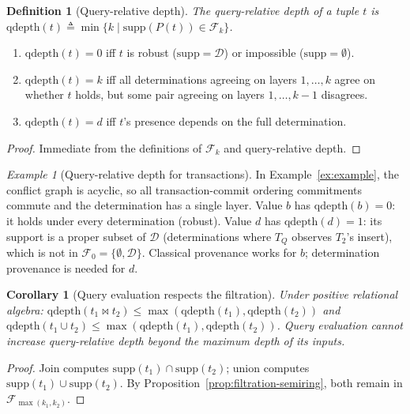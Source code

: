 \documentclass[acmsmall,review,anonymous]{acmart}
\newtheorem{definition}{Definition}
\newtheorem{corollary}{Corollary}
\theoremstyle{remark}
\newtheorem{example}{Example}
\numberwithin{definition}{section}
\numberwithin{theorem}{section}
\numberwithin{lemma}{section}
\numberwithin{corollary}{section}
\numberwithin{remark}{section}
\numberwithin{example}{section}
\numberwithin{observation}{section}
\numberwithin{assumption}{section}
\begin{document}
\begin{definition}[Query-relative depth]
  \label{def:query-depth}
  The \emph{query-relative depth} of a tuple $t$ is
  $\mathrm{qdepth}(t) \triangleq
  \min\{k \mid \mathrm{supp}(P(t)) \in \mathcal{F}_k\}$.
\end{definition}

\begin{proposition}[Characterization]
  \label{prop:qdepth-characterization}
  \leavevmode
  \begin{enumerate}[nosep,label=(\alph*)]
    \item $\mathrm{qdepth}(t) = 0$ iff $t$ is robust
          ($\mathrm{supp} = \mathcal{D}$) or impossible
          ($\mathrm{supp} = \emptyset$).
    \item $\mathrm{qdepth}(t) = k$ iff all determinations agreeing on
          layers $1, \ldots, k$ agree on whether $t$ holds, but some
          pair agreeing on layers $1, \ldots, k{-}1$ disagrees.
    \item $\mathrm{qdepth}(t) = d$ iff $t$'s presence depends on the
          full determination.
  \end{enumerate}
\end{proposition}
\begin{proof}
  Immediate from the definitions of $\mathcal{F}_k$ and query-relative depth.
\end{proof}

\begin{example}[Query-relative depth for transactions]
  \label{ex:qdepth-txn}
  In Example~\ref{ex:example}, the conflict graph is acyclic, so all
  transaction-commit ordering commitments commute and the determination
  has a single layer.
  Value $b$ has $\mathrm{qdepth}(b) = 0$: it holds under every
  determination (robust).
  Value $d$ has $\mathrm{qdepth}(d) = 1$: its support is a proper subset
  of $\mathcal{D}$ (determinations where $T_Q$ observes $T_2$'s insert),
  which is not in $\mathcal{F}_0 = \{\emptyset, \mathcal{D}\}$.
  Classical provenance works for $b$; determination provenance is needed
  for $d$.
\end{example}

\begin{corollary}[Query evaluation respects the filtration]
  \label{cor:propagation-filtration}
  Under positive relational algebra:
  $\mathrm{qdepth}(t_1 \bowtie t_2) \le
  \max(\mathrm{qdepth}(t_1), \mathrm{qdepth}(t_2))$
  and
  $\mathrm{qdepth}(t_1 \cup t_2) \le
  \max(\mathrm{qdepth}(t_1), \mathrm{qdepth}(t_2))$.
  Query evaluation cannot increase query-relative depth beyond the maximum
  depth of its inputs.
\end{corollary}
\begin{proof}
  Join computes $\mathrm{supp}(t_1) \cap \mathrm{supp}(t_2)$;
  union computes $\mathrm{supp}(t_1) \cup \mathrm{supp}(t_2)$.
  By Proposition~\ref{prop:filtration-semiring}, both remain in
  $\mathcal{F}_{\max(k_1, k_2)}$.
\end{proof}
\end{document}
